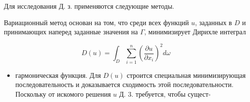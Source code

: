 \documentclass[10pt]{article}
\begin{document}
Для исследования Д. з. применяются следующие методы.



Вариационный метод основан на том, что среди всех функций $u$, заданных в $D$ и принимающих наперед заданные значения на $\Gamma$, минимизирует Дирихле интеграл



\[

D(u)=\int_{D} \sum_{i=1}^{n}\left(\frac{\partial u}{\partial x_{i}}\right)^{2} d \omega

\]



\begin{itemize}

  \item гармоническая функция. Для $D(u)$ строится специальная минимизирующая последовательность и доказывается сходимость этой последовательности. Поскольку от искомого решения $u$ Д. 3. требуется, чтобы сущест-

\end{itemize}
\end{document}
